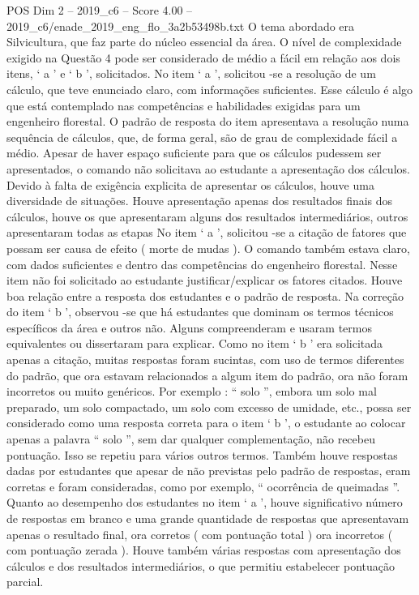 \begin{textsample}{POS Dim 2 – 2019\_c6 – Score 4.00 – 2019\_c6/enade\_2019\_eng\_flo\_3a2b53498b.txt}
O tema abordado era Silvicultura, que faz parte do núcleo essencial da área.
O nível de complexidade exigido na Questão 4 pode ser considerado de médio a fácil em relação aos dois itens, ‘ a ’ e ‘ b ’, solicitados.
No item ‘ a ’, solicitou -se a resolução de um cálculo, que teve enunciado claro, com informações suficientes.
Esse cálculo é algo que está contemplado nas competências e habilidades exigidas para um engenheiro florestal.
O padrão de resposta do item apresentava a resolução numa sequência de cálculos, que, de forma geral, são de grau de complexidade fácil a médio.
Apesar de haver espaço suficiente para que os cálculos pudessem ser apresentados, o comando não solicitava ao estudante a apresentação dos cálculos.
Devido à falta de exigência explicita de apresentar os cálculos, houve uma diversidade de situações.
Houve apresentação apenas dos resultados finais dos cálculos, houve os que apresentaram alguns dos resultados intermediários, outros apresentaram todas as etapas No item ‘ a ’, solicitou -se a citação de fatores que possam ser causa de efeito ( morte de mudas ).
O comando também estava claro, com dados suficientes e dentro das competências do engenheiro florestal.
Nesse item não foi solicitado ao estudante justificar/explicar os fatores citados.
Houve boa relação entre a resposta dos estudantes e o padrão de resposta.
Na correção do item ‘ b ’, observou -se que há estudantes que dominam os termos técnicos específicos da área e outros não.
Alguns compreenderam e usaram termos equivalentes ou dissertaram para explicar.
Como no item ‘ b ’ era solicitada apenas a citação, muitas respostas foram sucintas, com uso de termos diferentes do padrão, que ora estavam relacionados a algum item do padrão, ora não foram incorretos ou muito genéricos.
Por exemplo : “ solo ”, embora um solo mal preparado, um solo compactado, um solo com excesso de umidade, etc., possa ser considerado como uma resposta correta para o item ‘ b ’, o estudante ao colocar apenas a palavra “ solo ”, sem dar qualquer complementação, não recebeu pontuação.
Isso se repetiu para vários outros termos.
Também houve respostas dadas por estudantes que apesar de não previstas pelo padrão de respostas, eram corretas e foram consideradas, como por exemplo, “ ocorrência de queimadas ”.
Quanto ao desempenho dos estudantes no item ‘ a ’, houve significativo número de respostas em branco e uma grande quantidade de respostas que apresentavam apenas o resultado final, ora corretos ( com pontuação total ) ora incorretos ( com pontuação zerada ).
Houve também várias respostas com apresentação dos cálculos e dos resultados intermediários, o que permitiu estabelecer pontuação parcial.

\end{textsample}

